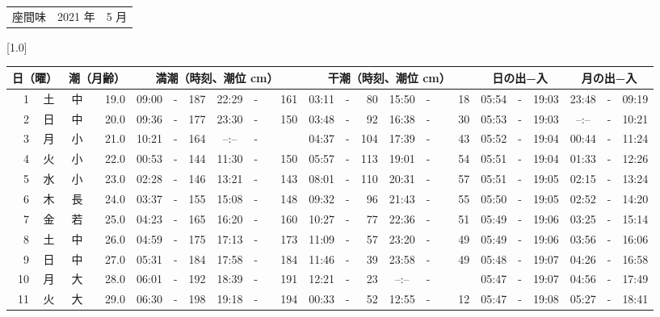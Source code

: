 \documentclass[12pt,a4j]{jsarticle}
\begin{document}
 \begin{table}[htbp]
 \begin{center}
 \begin{tabular}{lcc}
 \LARGE{座間味}  & \large{2021 年} & \large{ 5 月} \\
 \end{tabular}
 \end{center}
 \begin{center}
    \scalebox{0.7}[1.0]{
    \begin{tabular}{|rc|cr|ccrccr|ccrccr|ccc|ccc|}
    \hline
    \multicolumn{2}{|c|}{日（曜）} & \multicolumn{2}{c|}{潮（月齢）} & \multicolumn{6}{c|}{満潮（時刻、潮位 cm）} & \multicolumn{6}{c|}{干潮（時刻、潮位 cm）} & \multicolumn{3}{c|}{日の出−入} &  \multicolumn{3}{c|}{月の出−入}\\
 \hline
 1 & 土 & 中 & 19.0 &  09:00 &-& 187 &  22:29 &-& 161 &  03:11 &-&  80 &  15:50 &-&  18 & 05:54 & -& 19:03 & 23:48 & -& 09:19 \\
 2 & 日 & 中 & 20.0 &  09:36 &-& 177 &  23:30 &-& 150 &  03:48 &-&  92 &  16:38 &-&  30 & 05:53 & -& 19:03 & --:-- & -& 10:21 \\
 3 & 月 & 小 & 21.0 &  10:21 &-& 164 &  --:-- &-&~~~~~ &  04:37 &-& 104 &  17:39 &-&  43 & 05:52 & -& 19:04 & 00:44 & -& 11:24 \\
 4 & 火 & 小 & 22.0 &  00:53 &-& 144 &  11:30 &-& 150 &  05:57 &-& 113 &  19:01 &-&  54 & 05:51 & -& 19:04 & 01:33 & -& 12:26 \\
 5 & 水 & 小 & 23.0 &  02:28 &-& 146 &  13:21 &-& 143 &  08:01 &-& 110 &  20:31 &-&  57 & 05:51 & -& 19:05 & 02:15 & -& 13:24 \\
 6 & 木 & 長 & 24.0 &  03:37 &-& 155 &  15:08 &-& 148 &  09:32 &-&  96 &  21:43 &-&  55 & 05:50 & -& 19:05 & 02:52 & -& 14:20 \\
 7 & 金 & 若 & 25.0 &  04:23 &-& 165 &  16:20 &-& 160 &  10:27 &-&  77 &  22:36 &-&  51 & 05:49 & -& 19:06 & 03:25 & -& 15:14 \\
 8 & 土 & 中 & 26.0 &  04:59 &-& 175 &  17:13 &-& 173 &  11:09 &-&  57 &  23:20 &-&  49 & 05:49 & -& 19:06 & 03:56 & -& 16:06 \\
 9 & 日 & 中 & 27.0 &  05:31 &-& 184 &  17:58 &-& 184 &  11:46 &-&  39 &  23:58 &-&  49 & 05:48 & -& 19:07 & 04:26 & -& 16:58 \\
10 & 月 & 大 & 28.0 &  06:01 &-& 192 &  18:39 &-& 191 &  12:21 &-&  23 &  --:-- &-&~~~~~ & 05:47 & -& 19:07 & 04:56 & -& 17:49 \\
11 & 火 & 大 & 29.0 &  06:30 &-& 198 &  19:18 &-& 194 &  00:33 &-&  52 &  12:55 &-&  12 & 05:47 & -& 19:08 & 05:27 & -& 18:41 \\

\end{tabular}}
\end{center}
\end{table}
\end{document}
